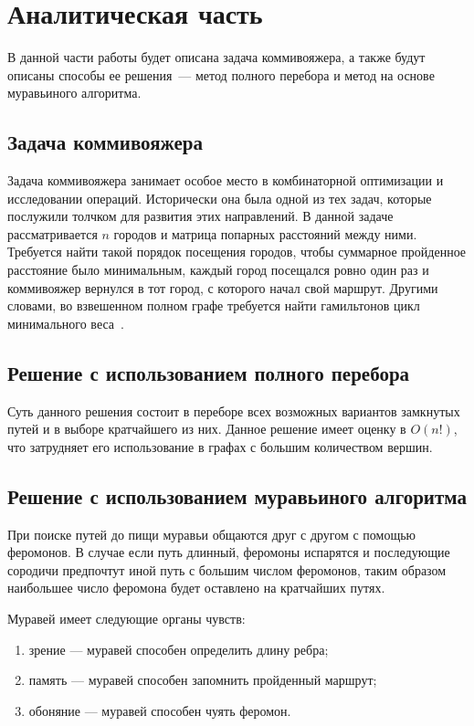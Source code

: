\chapter{Аналитическая часть}
В данной части работы будет описана задача коммивояжера,  а также будут описаны способы ее решения~--- метод полного перебора и метод на основе муравьиного алгоритма.

\section{Задача коммивояжера}

Задача коммивояжера занимает особое место в комбинаторной оптимизации и  исследовании  операций. Исторически она 
была одной из тех задач, которые послужили толчком для развития 
этих направлений. В данной задаче рассматривается $n$ городов и матрица попарных расстояний между ними. 
Требуется найти такой порядок посещения городов, чтобы  суммарное пройденное расстояние было минимальным, каждый город посещался ровно один раз и коммивояжер вернулся в тот город, с которого начал свой маршрут.  
Другими словами, во взвешенном полном графе требуется найти гамильтонов цикл минимального веса~\cite{salesman}. 

\section{Решение с использованием полного перебора}
Суть данного решения состоит в переборе всех возможных вариантов замкнутых путей и в выборе кратчайшего из них. Данное решение имеет оценку в $O(n!)$, что затрудняет его использование в графах с большим количеством вершин.

\section{Решение с использованием муравьиного алгоритма}
При поиске путей до пищи муравьи общаются друг с другом с помощью феромонов.
В случае если путь длинный, феромоны испарятся и последующие сородичи предпочтут иной путь с большим числом феромонов, таким образом наибольшее число феромона будет оставлено на кратчайших путях.

Муравей имеет следующие органы чувств:
\begin{enumerate}[label=\arabic*)]
	\item зрение --- муравей способен определить длину ребра;
	\item память --- муравей способен запомнить пройденный маршрут;
	\item обоняние --- муравей способен чуять феромон.
\end{enumerate}


